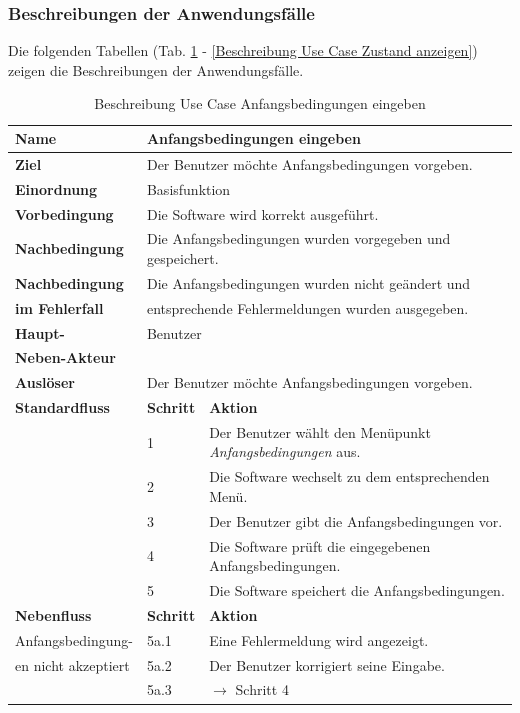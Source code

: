 \newpage
\subsubsection{Beschreibungen der Anwendungsfälle}
Die folgenden Tabellen (Tab. \ref{Beschreibung Use Case Anfangsbedingungen eingeben} - \ref{Beschreibung Use Case Zustand anzeigen}) zeigen die Beschreibungen der Anwendungsfälle.

\begin{table} [H]
	\centering
	\begin{tabular}{|l|l|l|}
		\hline
		\textbf{Name} 			& \multicolumn{2}{|l|}{Anfangsbedingungen eingeben}  \\
		\hline
		\textbf{Ziel} 			& \multicolumn{2}{|l|}{Der Benutzer möchte Anfangsbedingungen vorgeben. }\\ 
		\hline
		\textbf{Einordnung}		& \multicolumn{2}{|l|}{Basisfunktion}\\
		\hline
		\textbf{Vorbedingung}	& \multicolumn{2}{|l|}{Die Software wird korrekt ausgeführt.} \\
		\hline
		\textbf{Nachbedingung}	& \multicolumn{2}{|l|}{Die Anfangsbedingungen wurden vorgegeben und gespeichert.}\\
		\hline
		\textbf{Nachbedingung} 	& \multicolumn{2}{|l|}{Die Anfangsbedingungen wurden nicht geändert und}\\
		\textbf{im Fehlerfall}	& \multicolumn{2}{|l|}{entsprechende Fehlermeldungen wurden ausgegeben.}\\
		\hline
		\textbf{Haupt-} 			& \multicolumn{2}{|l|}{Benutzer}\\
		\textbf{Neben-Akteur}	& \multicolumn{2}{|l|}{	}			\\
		\hline
		\textbf{Auslöser} 		& \multicolumn{2}{|l|}{Der Benutzer möchte Anfangsbedingungen vorgeben.} \\
		\hline 
		\textbf{Standardfluss} & \textbf{Schritt} & \textbf{Aktion} \\
		\hline
		&	1	& Der Benutzer wählt den Menüpunkt \emph{Anfangsbedingungen} aus. \\
		\cline{2-3}
		&	2	& Die Software wechselt zu dem entsprechenden Menü.\\
		\cline{2-3}
		&	3	& Der Benutzer gibt die Anfangsbedingungen vor.\\
		\cline{2-3}
		&	4	& Die Software prüft die eingegebenen Anfangsbedingungen.\\
		\cline{2-3}
		&	5	& Die Software speichert die Anfangsbedingungen.\\
		\hline
		\textbf{Nebenfluss} & \textbf{Schritt} & \textbf{Aktion}\\
		\hline
		Anfangsbedingung-  & 5a.1 & Eine Fehlermeldung wird angezeigt.\\
		\cline{2-3}
		en nicht akzeptiert 	& 5a.2	& Der Benutzer korrigiert seine Eingabe.\\
		\cline{2-3}
					& 5a.3 	& $\rightarrow$ Schritt 4\\
		\hline
	\end{tabular}
	\caption{Beschreibung Use Case Anfangsbedingungen eingeben}
	\label{Beschreibung Use Case Anfangsbedingungen eingeben}
\end{table}

